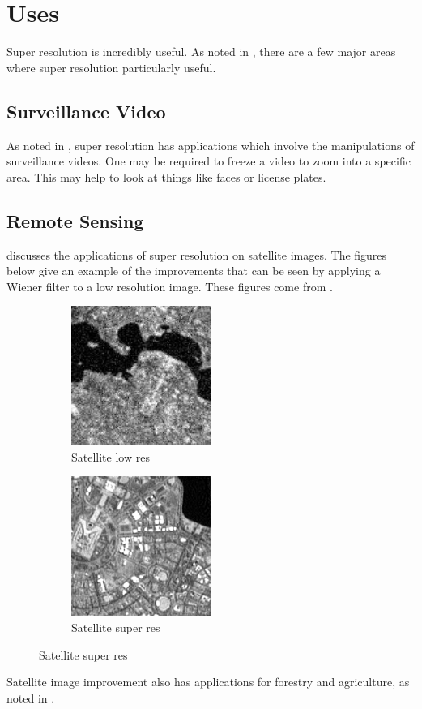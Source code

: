 \documentclass{article}
\begin{document}
\section{Uses}
\label{sec:uses}

Super resolution is incredibly useful. As noted in
\cite{Yang2010ImageSH}, there are a few major areas where super
resolution particularly useful.
\subsection{Surveillance Video}
As noted in \cite{Yang2010ImageSH}, super resolution has applications
which involve the manipulations of surveillance videos. One may be
required to freeze a video
to zoom into a specific area. This may help to look at things like faces or license plates.
\subsection{Remote Sensing}
\cite{Li} discusses the applications of super resolution on satellite
images. The figures below give an example of the improvements that can
be seen by applying a Wiener filter to a low resolution image. These
figures come from \cite{Li}.    
\begin{figure}[H]
  \centering
  \begin{subfigure}[b]{0.5\textwidth}
    \centering
  \includegraphics[width= 0.5\textwidth]{figures/LR-satellite.png}
  \caption{\label{fig:label} Satellite low res}
\end{subfigure}%
\begin{subfigure}[b]{0.5\textwidth}
  \centering
  \includegraphics[width = 0.5\textwidth]{figures/SR-satellite.png}
  \caption{\label{fig:label} Satellite super res}
  \end{subfigure}
\end{figure}
Satellite image improvement also has applications for forestry and
agriculture, as noted in \cite{LiSatellite}.
\end{document}
